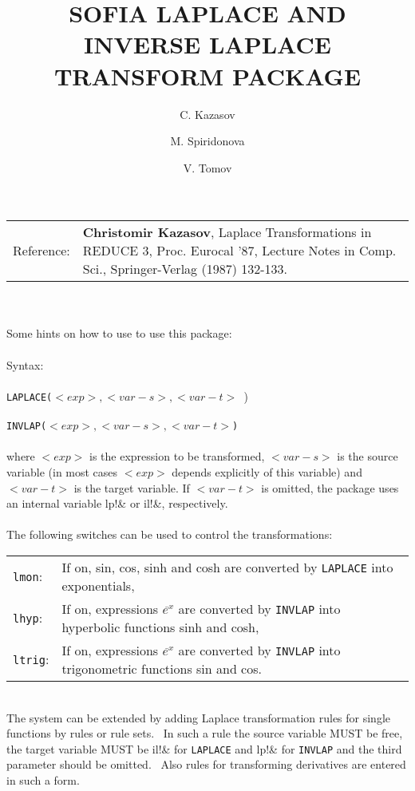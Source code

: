 \documentclass{article}
\title{SOFIA LAPLACE AND INVERSE LAPLACE TRANSFORM PACKAGE}
\author{C. Kazasov\and M. Spiridonova \and V. Tomov}
\date{}
\begin{document}
\maketitle

\begin{center}
\begin{tabular}{lp{10cm}}
Reference: & {\bf Christomir Kazasov}, Laplace Transformations in REDUCE 3, Proc.
Eurocal '87, Lecture Notes in Comp. Sci., Springer-Verlag
(1987) 132-133.
\end{tabular} 
\end{center}
\ \\
\ \\
Some hints on how to use to use this package: \\
\ \\
Syntax: \\
\ \\
{\tt LAPLACE($<exp>,<var-s>,<var-t>$ }) \\
\ \\
{\tt INVLAP($<exp>,<var-s>,<var-t>$)} \\
\ \\
where $<exp>$ is the expression to be transformed, $<var-s>$ is the source
variable (in most cases $<exp>$ depends explicitly of this variable) and
$<var-t>$ is the target variable. If $<var-t>$ is omitted, the package uses
an internal variable lp!\& or il!\&, respectively. \\
\ \\
The following switches can be used to control the transformations: \\
\begin{center}
\begin{tabular}{lp{10cm}}
{\tt lmon}: & If on, sin, cos, sinh and cosh are converted by {\tt LAPLACE} into
exponentials, \\
{\tt lhyp}: & If on, expressions $e^{\tilde{}x}$ are converted by {\tt INVLAP} into 
hyperbolic functions sinh and cosh, \\
{\tt ltrig}: & If on, expressions $e^{\tilde{}x}$ are converted by {\tt INVLAP} into
trigonometric functions sin and cos. \\
\end{tabular} 
\end{center}
\ \\
The system can be extended by adding Laplace transformation rules for
single functions by rules or rule sets.~ In such a rule the source
variable MUST be free, the target variable MUST be il!\& for {\tt LAPLACE} and
lp!\& for {\tt INVLAP} and the third parameter should be omitted.~ Also rules for
transforming derivatives are entered in such a form. \\
\end{document}
